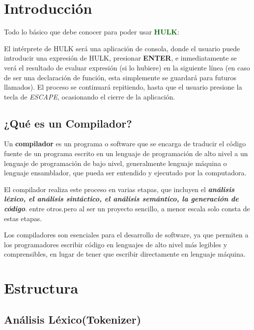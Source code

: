 \documentclass[a4paper,12pt]{article}
\begin{document}
	
	\section{\color{violet}Introducción}
	
	\begin{center}
			\large Todo lo básico que debe conocer para poder usar \textbf{\textcolor{darkgreen}{HULK}}:
	\end{center}

    El intérprete de HULK será una aplicación de consola, donde el usuario puede introducir una expresión de HULK, presionar \textbf{ENTER}, e inmediatamente se verá el resultado de evaluar expresión (si lo hubiere) en la siguiente línea (en caso de ser una declaración de función, esta simplemente se guardará para futuros llamados). El proceso se continuará repitiendo, hasta que el usuario presione la tecla de \textit{ESCAPE}, ocasionando el cierre de la aplicación.
    
	
	\subsection{¿Qué es un Compilador?}
	Un \textbf{compilador} es un programa o software que se encarga de traducir el código fuente de un programa escrito en un lenguaje de programación de alto nivel a un lenguaje de programación de bajo nivel, generalmente lenguaje máquina o lenguaje ensamblador, que pueda ser entendido y ejecutado por la computadora. 
	
	El compilador realiza este proceso en varias etapas, que incluyen el \textbf{\textit{análisis léxico, el análisis sintáctico, el análisis semántico, la generación de código}}. entre otros.pero al ser un proyecto sencillo, a menor escala solo consta de estas etapas.
	
	Los compiladores son esenciales para el desarrollo de software, ya que permiten a los programadores escribir código en lenguajes de alto nivel más legibles y comprensibles, en lugar de tener que escribir directamente en lenguaje máquina.
	
	\section{\color{violet}Estructura}
	
	\subsection{Análisis Léxico(Tokenizer)}
	
\end{document}
